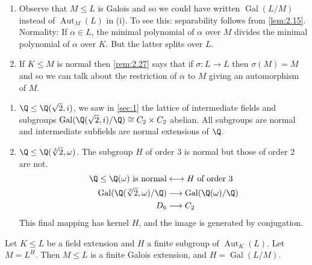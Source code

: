 \documentclass{article}
\DeclareMathOperator{\Aut}{Aut}
\DeclareMathOperator{\Gal}{Gal}
\begin{document}
\begin{remark}
    \begin{enumerate}[label=(\roman*)]
        \item Observe that $M \leq L$ is Galois and so we could have written $\Gal(L/M)$ instead of $\Aut_M(L)$ in (i).
            To see this: separability follows from \cref{lem:2.15}.
            Normality: If $\alpha \in L$, the minimal polynomial of $\alpha$ over $M$ divides the minimal polynomial of $\alpha$ over $K$.
            But the latter splits over $L$.
        \item If $K \leq M$ is normal then \cref{rem:2.27} says that if $\sigma: L \to L$ then $\sigma(M) = M$ and so we can talk about the restriction of $\alpha$ to $M$ giving an automorphism of $M$.
    \end{enumerate}
\end{remark}

\begin{eg}
    \begin{enumerate}[label=(\roman*)]
        \item $\Q \leq \Q(\sqrt{2}, i)$, we saw in \cref{sec:1} the lattice of intermediate fields and subgroups $\Gal(\Q(\sqrt{2}, i)/\Q) \cong C_2 \times C_2$ abelian.
            All subgroups are normal and intermediate subfields are normal extensions of $\Q$.
        \item $\Q \leq \Q(\sqrt[3]{2}, \omega)$.
            The subgroup $H$ of order 3 is normal but those of order 2 are not.
            \begin{align*}
                \Q \leq \Q(\omega) \text{ is normal} &\longleftrightarrow H \text{ of order } 3 \\
                \Gal(\Q(\sqrt[3]{2}, \omega)/\Q) &\longrightarrow \Gal(\Q(\omega)/\Q) \\
                D_6 &\longrightarrow C_2
            \end{align*}
            This final mapping has kernel $H$, and the image is generated by conjugation.
    \end{enumerate}
\end{eg}


\begin{nthm}\label{thm:3.3}
    Let $K \leq L$ be a field extension and $H$ a finite subgroup of $\Aut_K(L)$.
    Let $M = L^H$. Then $M \leq L$ is a finite Galois extension, and $H = \Gal(L/M)$.
\end{nthm}
\end{document}
